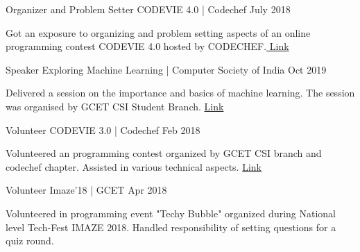 

\begin{cventries}

  \cventry
    {Organizer and Problem Setter} %
    {CODEVIE 4.0 | Codechef} %
    {} %
    {July 2018} %
    {
      \begin{cvitems} %
        \item {Got an exposure to organizing and problem setting aspects of an online programming contest CODEVIE 4.0 hosted by CODECHEF.\href{https://www.codechef.com/COV42018}{ Link}
        }
      \end{cvitems}
    }

  \cventry
    {Speaker} %
    {Exploring Machine Learning | Computer Society of India} %
    {} %
    {Oct 2019} %
    {
      \begin{cvitems} %
        \item {Delivered a session on the importance and basics of machine learning. The session was organised by GCET CSI Student Branch. \href{https://drive.google.com/file/d/1VSwZUOWtNTnVfiDONBFNVpIrVZRuq-kI/view?usp=sharing}{  Link}}
      \end{cvitems}
    }

   \cventry
    {Volunteer} %
    {CODEVIE 3.0 | Codechef} %
    {} %
    {Feb 2018} %
    {
      \begin{cvitems} %
        \item {Volunteered an programming contest organized by GCET CSI branch and codechef chapter. Assisted in various technical aspects. \href{https://drive.google.com/file/d/1KsvBWcmMmWd7ItUhIyrPvH8vzJUS76EP/view?usp=sharing}{ Link}
        }
      \end{cvitems}
    }

  \cventry
     {Volunteer} %
    {Imaze'18 | GCET} %
    {} %
    {Apr 2018} %
    {
      \begin{cvitems} %
        \item {Volunteered in programming event "Techy Bubble" organized during National level Tech-Fest IMAZE 2018. Handled responsibility of setting questions for a quiz round.}
      \end{cvitems}
    }


\end{cventries}

